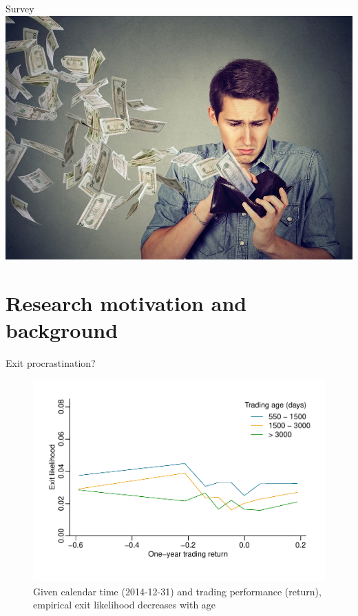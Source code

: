 \documentclass{beamer}
\begin{document}
\begin{frame}[allowframebreaks]{Survey}
	\includegraphics[scale=0.2]{figures/sadmoney}
	
\end{frame}


\section{Research motivation and background}

\begin{frame}{Exit procrastination?}
	
	\begin{figure}
	\includegraphics[width=0.85\linewidth,trim={10 30 0 0},clip]{figures/pltexitgivenT-1}
	\caption{Given calendar time (2014-12-31) and trading performance (return), empirical exit likelihood decreases with age}
	\end{figure}

\end{frame}
\end{document}
